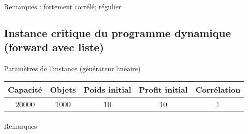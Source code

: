\documentclass[12pt]{article}
\begin{document}
\begin{figure}[!h]
\begin{floatrow}
\end{floatrow}
\end{figure}

\paragraph{}Remarques : fortement corrélé; régulier

\subsection{Instance critique du programme dynamique (forward avec liste)}

\paragraph{}Paramètres de l'instance (générateur linéaire)

\begin{tabular}{|c|c|c|c|c|}
	\hline
	Capacité & Objets & Poids initial & Profit initial & Corrélation \\
	\hline
	20000 & 1000 & 10 & 10 & 1 \\
	\hline
\end{tabular}

\paragraph{}Remarques

\begin{figure}[!h]
\begin{floatrow}
\end{floatrow}
\end{figure}
\end{document}
